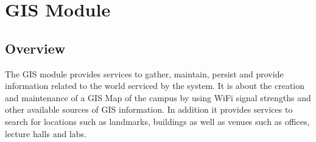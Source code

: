 \section{GIS Module}

\subsection{Overview}
The GIS module provides services to gather, maintain, persist and provide information related to the world serviced by the system. It is about the creation and maintenance of a GIS Map of the
campus by using WiFi signal strengths and other available sources of GIS information. In addition it provides services to search for locations such as landmarks, buildings as well as venues such as offices, lecture halls and labs.
